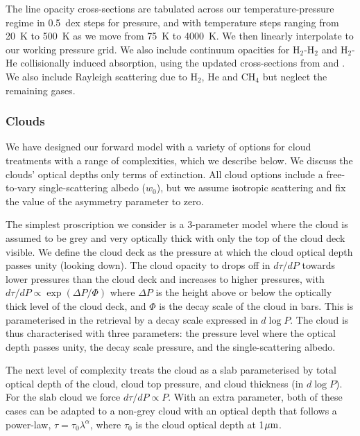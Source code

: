 \documentclass[useAMS,usenatbib]{mn2e}
\begin{document}
The line opacity cross-sections are tabulated across our temperature-pressure regime in 0.5~dex steps for pressure, and with temperature steps ranging from 20~K to 500~K as we move from 75~K to 4000~K. We then linearly interpolate to our working pressure grid.  We also include continuum opacities for H$_{2}$-H$_{2}$ and H$_{2}$-He collisionally induced absorption, using the updated cross-sections from  \citet{richard2012} and \citet{saumon2012}.  We also include Rayleigh scattering due to H$_{2}$, He and CH$_{4}$ but neglect the remaining gases.



\subsubsection{Clouds}

We have designed our forward model with a variety of options for cloud treatments with a range of complexities, which we describe below. We discuss the clouds' optical depths only terms of extinction. All cloud options include a free-to-vary single-scattering albedo ($w_{0}$), but we assume isotropic scattering and fix the value of the asymmetry parameter to zero.  

The simplest proscription we consider is a 3-parameter model where the cloud is assumed to be grey and very optically thick with only the top of the cloud deck visible. We define the cloud deck as the pressure at which the cloud optical depth passes unity (looking down). The cloud opacity to drops off in $d\tau/dP$ towards lower pressures than the cloud deck and increases to higher pressures, with $d\tau/dP \propto \exp(\Delta P / \Phi)$ where $\Delta P$ is the height above or below the optically thick level of the cloud deck, and  $\Phi$ is the decay scale of the cloud in bars. This is parameterised in the retrieval by a decay scale expressed in $d\log P$.  The cloud is thus characterised with three parameters: the pressure level where the optical depth passes unity, the decay scale pressure, and the single-scattering albedo. 

The next level of complexity treats the cloud as a slab parameterised by total optical depth of the cloud, cloud top pressure, and cloud thickness (in $d\log P$). For the slab cloud we force $d\tau / dP \propto P$. With an extra parameter, both of these cases can be adapted to a non-grey cloud with an optical depth that follows a power-law, $\tau = \tau_{0} \lambda^{\alpha}$, where $\tau_{0}$ is the cloud optical depth at 1$\hbox{$\mu$m}$. 
\end{document}
